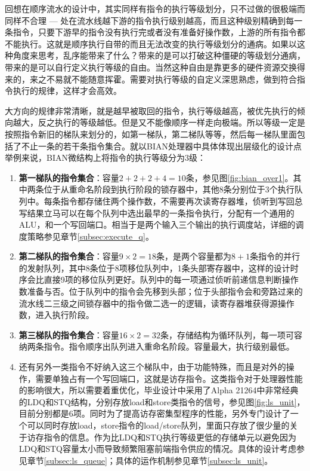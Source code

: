回想在顺序流水的设计中，其实同样有指令的执行等级划分，只不过做的很极端而同样不合理 --- 处在流水线越下游的指令执行级别越高，而且这种级别精确到每一条指令，只要下游早的指令没有执行完或者没有准备好操作数，上游的所有指令都不能执行。这就是顺序执行自带的而且无法改变的执行等级划分的通病。如果以这种角度来思考，乱序能带来了什么？带来的是可以打破这种僵硬的等级划分通病，带来的是可以自行定义执行等级的自由。当然这种自由是靠更多的硬件资源交换得来的，来之不易就不能随意挥霍。需要对执行等级的自定义深思熟虑，做到符合指令执行的规律，这样才会高效。

大方向的规律非常清晰，就是越早被取回的指令，执行等级越高，被优先执行的倾向越大，反之执行的等级越低。但是又不能像顺序一样走向极端。所以等级一定是按照指令新旧的梯队来划分的，如第一梯队，第二梯队等等，然后每一梯队里面包括了不止一条的若干条指令集合。就以BIAN处理器中具体体现出层级化的设计点举例来说，BIAN微结构上将指令的执行等级分为3级：
\begin{enumerate}[label=(\alph*)]
	\item \textbf{第一梯队的指令集合}：容量$2 + 2 + 2 + 4 = 10$条，参见图\ref{fig:bian_over1}。其中两条位于从重命名阶段到执行阶段的锁存器中，其他8条分别位于3个执行队列中。每条指令都存储住两个操作数，不需要再次读寄存器堆，侦听到写回总写结果立马可以在每个队列中选出最早的一条指令执行，分配有一个通用的ALU，和一个写回端口。相当于是两个输入三个输出的执行调度站，详细的调度策略参见章节\ref{subsec:execute_q}。
	\item \textbf{第二梯队的指令集合}：容量$ 9\times 2 = 18$条，是两个容量都为$ 8 + 1 $条指令的并行的发射队列，其中8条位于8项移位队列中，1条头部寄存器中，这样的设计时序会比直接9项的移位队列更好。队列中的每一项通过侦听前递信息判断操作数准备与否。位于队列中的指令会先移到头部；位于头部指令会和旁路过来的流水线二三级之间锁存器中的指令做二选一的逻辑，读寄存器堆获得源操作数，进入执行阶段。
	\item \textbf{第三梯队的指令集合}：容量$ 16\times 2 = 32$条，存储结构为循环队列，每一项可容纳两条指令。指令顺序出队列进入重命名阶段。容量最大，执行级别最低。
	\item 还有另外一类指令不好纳入这三个梯队中，由于功能特殊，而且是对外的操作，需要单独占有一个写回端口，这就是访存指令。这类指令对于处理器性能的影响很大，所以需要着重优化，毕业设计中采用了Alpha 21264中非常经典的LDQ和STQ结构，分别存放load和store类指令的信号，参见图\ref{fig:ls_unit}，目前分别都是6项。同时为了提高访存密集型程序的性能，另外专门设计了一个可以同时存放load，store指令的load/store队列，里面只存放了很少量的关于访存指令的信息。作为比LDQ和STQ执行等级更低的存储单元以避免因为LDQ和STQ容量太小而导致频繁阻塞前端指令供应的情况。具体的设计考虑参见章节\ref{subsec:ls_queue}；具体的运作机制参见章节\ref{subsec:ls_unit}。
\end{enumerate}

